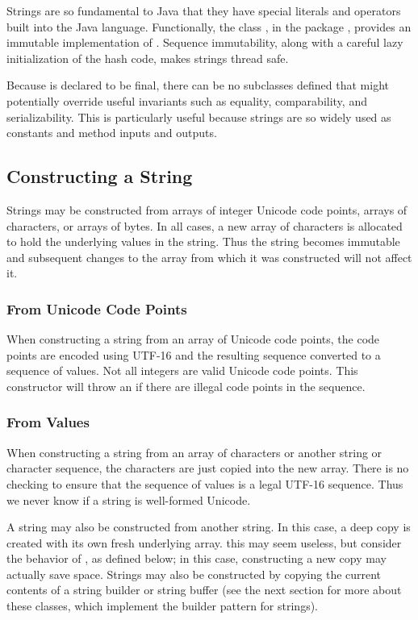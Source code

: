 Strings are so fundamental to Java that they have special literals and
operators built into the Java language.  Functionally, the class
, in the package , provides an immutable
implementation of .  Sequence immutability, along
with a careful lazy initialization of the hash code, makes strings
thread safe.

Because  is declared to be final, there can be no
subclasses defined that might potentially override useful invariants
such as equality, comparability, and serializability.  This is
particularly useful because strings are so widely used as constants
and method inputs and outputs.

\subsection{Constructing a String}

Strings may be constructed from arrays of integer Unicode code points,
arrays of characters, or arrays of bytes.  In all cases, a new array
of characters is allocated to hold the underlying  values
in the string.  Thus the string becomes immutable and subsequent
changes to the array from which it was constructed will not affect it.

\subsubsection{From Unicode Code Points}

When constructing a string from an array of Unicode code points, the
code points are encoded using UTF-16 and the resulting sequence
converted to a sequence of  values.  Not all integers are
valid Unicode code points.  This constructor will throw an
 if there are illegal code points in
the sequence.

\subsubsection{From  Values}

When constructing a string from an array of characters or another
string or character sequence, the characters are just copied into the
new array.  There is no checking to ensure that the sequence of
 values is a legal UTF-16 sequence.  Thus we never know if
a string is well-formed Unicode.

A string may also be constructed from another string.  In this case, a
deep copy is created with its own fresh underlying array.  this may
seem useless, but consider the behavior of , as
defined below; in this case, constructing a new copy may actually save
space.  Strings may also be constructed by copying the current
contents of a string builder or string buffer (see the next section
for more about these classes, which implement the builder pattern for
strings).

